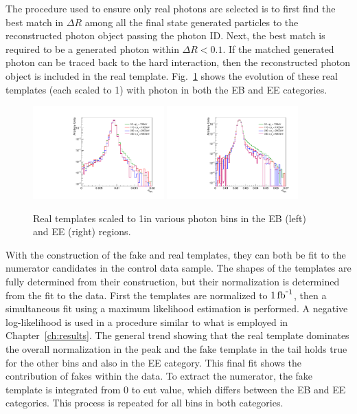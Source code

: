 The procedure used to ensure only real photons are selected is to first find the best match in $\Delta R$ among all the final state generated particles to the reconstructed photon object passing the photon ID. Next, the best match is required to be a generated photon within $\Delta R<0.1$. If the matched generated photon can be traced back to the hard interaction, then the reconstructed photon object is included in the real template. Fig.~\ref{fig:real_templates} shows the evolution of these real templates (each scaled to 1\fbinv) with photon \pt in both the EB and EE categories.

\begin{figure}[!htbp]
  \centering
  \includegraphics[width=0.45\textwidth]{figures/realtemplatecompEB.pdf}
  \includegraphics[width=0.45\textwidth]{figures/realtemplatecompEE.pdf}
  \caption{Real templates scaled to 1\fbinv in various photon \pt bins in the EB (left) and EE (right) regions.}
  \label{fig:real_templates}
\end{figure}

With the construction of the fake and real templates, they can both be fit to the numerator candidates in the control data sample. The shapes of the templates are fully determined from their construction, but their normalization is determined from the fit to the data. First the templates are normalized to $1\mbox{\ensuremath{\,\text{fb}^{\mbox{-}1}}}$, then a simultaneous fit using a maximum likelihood estimation is performed. A negative log-likelihood is used in a procedure similar to what is employed in Chapter~\ref{ch:results}.  The general trend showing that the real template dominates the overall normalization in the peak and the fake template in the tail holds true for the other \pt bins and also in the EE category. This final fit shows the contribution of fakes within the data. To extract the numerator, the fake template is integrated from 0 to \sieie cut value, which differs between the EB and EE categories. This process is repeated for all \pt bins in both categories.

